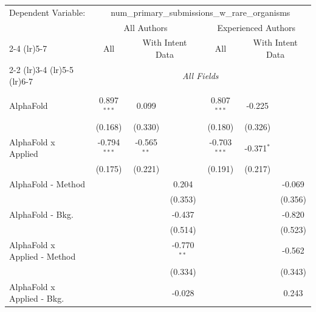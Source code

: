 \begingroup
\centering
\begin{tabular}{lcccccc}
   \tabularnewline \midrule \midrule
   Dependent Variable: & \multicolumn{6}{c}{num\_primary\_submissions\_w\_rare\_organisms}\\
 & \multicolumn{3}{c}{All Authors} & \multicolumn{3}{c}{Experienced Authors} \\
\cmidrule(lr){2-4} \cmidrule(lr){5-7}
 & \multicolumn{1}{c}{All} & \multicolumn{2}{c}{With Intent Data} & \multicolumn{1}{c}{All} & \multicolumn{2}{c}{With Intent Data} \\
\cmidrule(lr){2-2} \cmidrule(lr){3-4} \cmidrule(lr){5-5} \cmidrule(lr){6-7}
 & \multicolumn{6}{c}{\textit{All Fields}} \\ \\
   AlphaFold                      & 0.897$^{***}$  & 0.099         &               & 0.807$^{***}$  & -0.225        &   \\   
                                  & (0.168)        & (0.330)       &               & (0.180)        & (0.326)       &   \\   
   AlphaFold x Applied            & -0.794$^{***}$ & -0.565$^{**}$ &               & -0.703$^{***}$ & -0.371$^{*}$  &   \\   
                                  & (0.175)        & (0.221)       &               & (0.191)        & (0.217)       &   \\   
   AlphaFold - Method             &                &               & 0.204         &                &               & -0.069\\   
                                  &                &               & (0.353)       &                &               & (0.356)\\   
   AlphaFold - Bkg.               &                &               & -0.437        &                &               & -0.820\\   
                                  &                &               & (0.514)       &                &               & (0.523)\\   
   AlphaFold x Applied - Method   &                &               & -0.770$^{**}$ &                &               & -0.562\\   
                                  &                &               & (0.334)       &                &               & (0.343)\\   
   AlphaFold x Applied - Bkg.     &                &               & -0.028        &                &               & 0.243\\   

\end{tabular}
